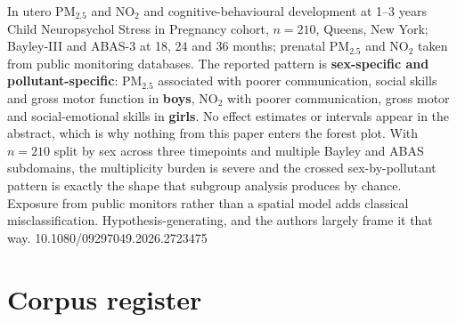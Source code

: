 \documentclass[10pt]{article}
\begin{document}
{In utero PM$_{2.5}$ and NO$_2$ and cognitive-behavioural development at 1--3 years}
{Child Neuropsychol}
{Stress in Pregnancy cohort, \textbf{$n=210$}, Queens, New York; Bayley-III and ABAS-3 at 18,
24 and 36 months; prenatal PM$_{2.5}$ and NO$_2$ taken from public monitoring databases.
The reported pattern is \textbf{sex-specific and pollutant-specific}: PM$_{2.5}$ associated
with poorer communication, social skills and gross motor function in \textbf{boys}, NO$_2$
with poorer communication, gross motor and social-emotional skills in \textbf{girls}. No
effect estimates or intervals appear in the abstract, which is why nothing from this paper
enters the forest plot. With $n=210$ split by sex across three timepoints and multiple Bayley
and ABAS subdomains, the multiplicity burden is severe and the crossed sex-by-pollutant
pattern is exactly the shape that subgroup analysis produces by chance. Exposure from public
monitors rather than a spatial model adds classical misclassification. Hypothesis-generating,
and the authors largely frame it that way.}
{10.1080/09297049.2026.2723475}

\section*{\sffamily\bfseries\color{Deep}Corpus register}
\vspace{-1.5mm}{\color{Amber}\rule{\linewidth}{1.1pt}}\vspace{2.5mm}


\end{document}

